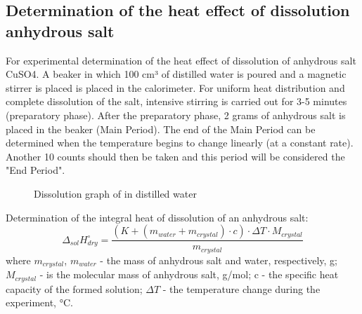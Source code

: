 \documentclass[12pt, letterpaper]{article}
\begin{document}
        \subsection{Determination of the heat effect of dissolution
anhydrous salt }
        For experimental determination of the heat effect of dissolution of anhydrous salt CuSO4. A beaker in which 100 cm³ of distilled water is poured and a magnetic stirrer is placed is placed in the calorimeter. For uniform heat distribution and complete dissolution of the salt, intensive stirring is carried out for 3-5 minutes (preparatory phase). After the preparatory phase, 2 grams of anhydrous salt is placed in the beaker (Main Period). The end of the Main Period can be determined when the temperature begins to change linearly (at a constant rate). Another 10 counts should then be taken and this period will be considered the "End Period".
        \begin{figure}[h]
            \centering
            \caption{Dissolution graph of  in distilled water}
        \end{figure}
        Determination of the integral heat of dissolution of an anhydrous salt: 
        \begin{equation}
            \Delta_{sol}H^\circ_{dry} = \frac{(K + (m_{water} + m_{crystal}) \cdot c) \cdot \Delta T \cdot M_{crystal}}{m_{crystal}}
        \end{equation}
        where $ m_{crystal}$, $m_{water}$ - the mass of anhydrous salt and water, respectively, g; $M_{crystal}$ - is the molecular mass of anhydrous salt, g/mol; c - the specific heat capacity of the formed solution; $\Delta T$ - the temperature change during the experiment, °C. \\
\end{document}
